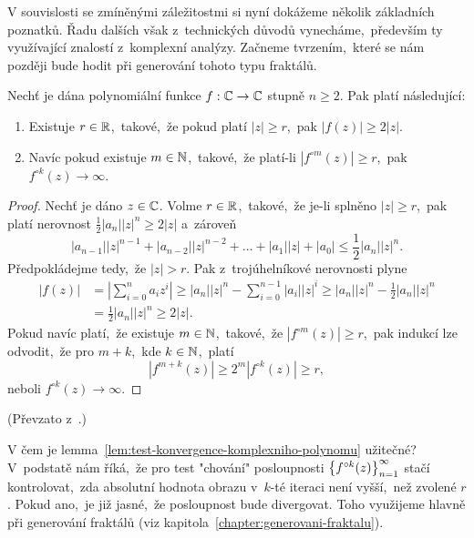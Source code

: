V souvislosti se zmíněnými záležitostmi si nyní dokážeme několik základních poznatků. Řadu dalších však z~technických důvodů vynecháme,~především ty využívající znalostí z~komplexní analýzy. Začneme tvrzením,~které se nám později bude hodit při generování tohoto typu fraktálů.
\begin{lemma}\label{lem:test-konvergence-komplexniho-polynomu}
    Nechť je dána polynomiální funkce $f:\mathbb{C} \rightarrow \mathbb{C}$ stupně $n\geqslant 2$. Pak platí následující:
    \begin{enumerate}[label=(\roman*)]
        \item Existuje $r\in\mathbb{R}$,~takové,~že pokud platí $|z|\geqslant r$,~pak $|f(z)|\geqslant2|z|$.
        \item Navíc pokud existuje $m\in\mathbb{N}$,~takové,~že platí-li $|f^{\circ m}(z)|\geqslant r$,~pak $f^{\circ k}(z)\to\infty$.
    \end{enumerate} 
\end{lemma}
\begin{proof}
    Nechť je dáno $z\in\mathbb{C}$. Volme $r\in\mathbb{R}$,~takové,~že je-li splněno $|z|\geqslant r$,~pak platí nerovnost $\frac{1}{2}|a_n||z|^n\geqslant 2|z|$ a~zároveň
    \[|a_{n-1}||z|^{n-1}+|a_{n-2}||z|^{n-2}+\dots+|a_1||z|+|a_0|\leqslant\frac{1}{2}|a_n||z|^n.\]
    Předpokládejme tedy,~že $|z|>r$. Pak z~trojúhelníkové nerovnosti plyne
    \begin{align*}
        |f(z)|&=\left|\sum_{i=0}^{n}a_iz^i\right|\geqslant|a_n||z|^n-\sum_{i=0}^{n-1}|a_i||z|^i\geqslant|a_n||z|^n-\frac{1}{2}|a_n||z|^n\\
        &=\frac{1}{2}|a_n||z|^n\geqslant2|z|.
    \end{align*}
    Pokud navíc platí,~že existuje $m\in\mathbb{N}$,~takové,~že $|f^{\circ m}(z)|\geqslant r$,~pak indukcí lze odvodit,~že pro $m+k$,~kde $k\in\mathbb{N}$,~platí
    \[|f^{m+k}(z)|\geqslant2^m|f^{\circ k}(z)|\geqslant r,\]
    neboli $f^{\circ k}(z)\to\infty$.
\end{proof}
(Převzato z~\cite[str. 237]{Falconer1989}.)

V čem je lemma~\ref{lem:test-konvergence-komplexniho-polynomu} užitečné? V~podstatě nám říká,~že pro test "chování" posloupnosti $\left\{f^{\circ k}(z)\right\}_{n=1}^\infty$ stačí kontrolovat,~zda absolutní hodnota obrazu v~$k$-té iteraci není vyšší,~než zvolené $r$. Pokud ano,~je již jasné,~že posloupnost bude divergovat. Toho využijeme hlavně při generování fraktálů (viz kapitola~\ref{chapter:generovani-fraktalu}).

